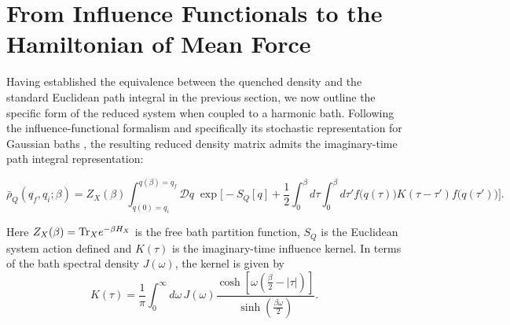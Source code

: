 \section{\label{sec:influence_to_hmf}From Influence Functionals to the Hamiltonian of Mean Force}
Having established the equivalence between the quenched density and the standard Euclidean path integral in the previous section, we now outline the specific form of the reduced system when coupled to a harmonic bath. Following the influence-functional formalism \cite{feynmanTheoryGeneralQuantum1963a,caldeiraQuantumTunnellingDissipative1983a,grabertQuantumBrownianMotion1988} and specifically its stochastic representation for Gaussian baths \cite{mccaulPartitionfreeApproachOpen2017c, mccaulDrivingSpinbosonModels2018a, mccaulHowWinFriends2021b}, the resulting reduced density matrix admits the imaginary-time path integral representation:
\begin{widetext}
\begin{equation}
    \bar\rho_Q(q_f,q_i;\beta) = Z_X(\beta) \int_{q(0)=q_i}^{q(\beta)=q_f}\!\!\mathcal D q\; \exp\Bigg[ -S_Q[q] + \frac{1}{2}\int_0^\beta d\tau\int_0^\beta d\tau' f\big(q(\tau)\big) K(\tau-\tau') f\big(q(\tau')\big) \Bigg].
    \label{eq:reduced_effective_PI}
\end{equation}
\end{widetext}
Here $Z_X(\beta)=\mathrm{Tr}_X e^{-\beta H_X}$ is the free bath partition function, $S_Q$ is the Euclidean system action defined and $K(\tau)$ is the imaginary-time influence kernel. In terms of the bath spectral density $J(\omega)$, the kernel is given by~\cite{weissQuantumDissipativeSystems2012, feynmanTheoryGeneralQuantum1963a}
\begin{equation}
    K(\tau) = \frac{1}{\pi}\int_0^\infty d\omega\, J(\omega) \frac{\cosh\!\left[\omega\left(\frac{\beta}{2}-|\tau|\right)\right]} {\sinh\!\left(\frac{\beta\omega}{2}\right)}.
    \label{eq:kernel_spectral}
\end{equation}

